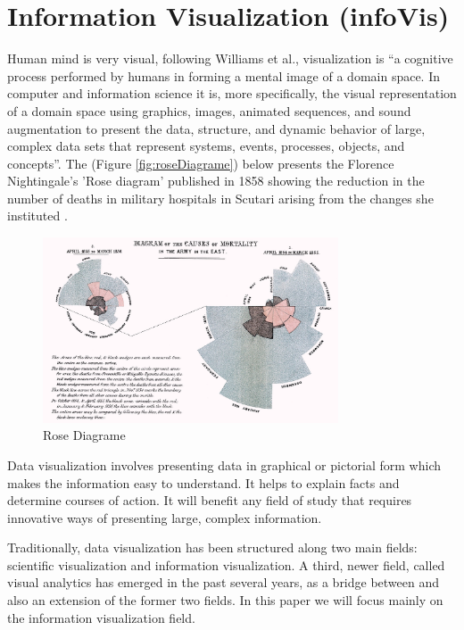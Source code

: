 \chapter{Information Visualization (infoVis)}

Human mind is very visual, following Williams et al., visualization is “a cognitive process performed by humans in forming a mental image of a domain space. In computer and information science it is, more specifically, the visual representation of a domain space using graphics, images, animated sequences, and sound augmentation to present the data, structure, and dynamic behavior of large, complex data sets that represent systems, events, processes, objects, and concepts”\cite{williamsVisualization1995}. The (Figure \ref{fig:roseDiagrame}) below presents the Florence Nightingale's 'Rose diagram' published in 1858 showing the reduction in the number of deaths in military hospitals in Scutari arising from the changes she instituted\cite{spence2001information} .

\begin{figure}[h!]
    \center
    \includegraphics[width=0.78\textwidth]{images/chapter2/rose.jpg}
    \caption{Rose Diagrame}
    \label{fig:roseDiagram}
  \end{figure}

 \newpage 
  Data visualization involves presenting data in graphical or pictorial form which makes the information easy to understand. It helps to explain facts and determine courses of action. It will benefit any field of study that requires innovative ways of presenting large, complex information\cite{spence2001information}.



  Traditionally, data visualization has been structured along two main fields: scientific visualization and information visualization. A third, newer field, called visual analytics has emerged in the past several years, as a bridge between and also an extension of the former two fields\cite{teleaDataVisualizationPrinciples2008}. In this paper we will focus mainly on the information visualization field.

